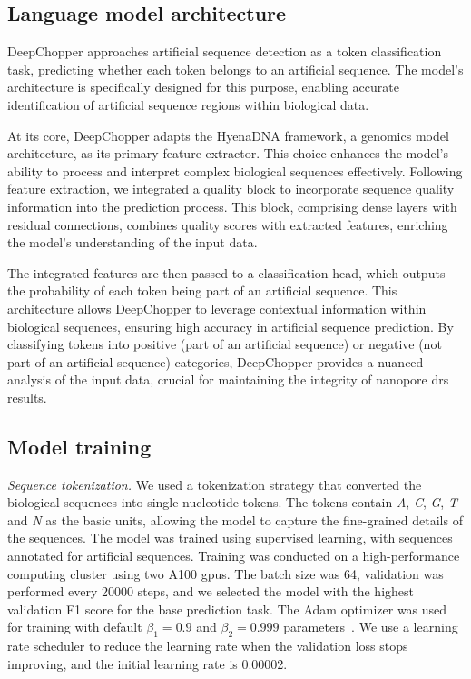 \documentclass[pdflatex, sn-mathphys-num, lineno]{sn-jnl}%
\theoremstyle{thmstyleone}%
\theoremstyle{thmstyletwo}%
\theoremstyle{thmstylethree}%
\begin{document}
\subsection{Language model architecture}\label{ssec:lm}

DeepChopper approaches artificial sequence detection as a token classification task, predicting whether each token belongs to an artificial sequence.
The model's architecture is specifically designed for this purpose, enabling accurate identification of artificial sequence regions within biological data.

At its core, DeepChopper adapts the HyenaDNA framework, a genomics model architecture, as its primary feature extractor.
This choice enhances the model's ability to process and interpret complex biological sequences effectively.
Following feature extraction, we integrated a quality block to incorporate sequence quality information into the prediction process.
This block, comprising dense layers with residual connections, combines quality scores with extracted features, enriching the model's understanding of the input data.

The integrated features are then passed to a classification head, which outputs the probability of each token being part of an artificial sequence.
This architecture allows DeepChopper to leverage contextual information within biological sequences, ensuring high accuracy in artificial sequence prediction.
By classifying tokens into positive (part of an artificial sequence) or negative (not part of an artificial sequence) categories, DeepChopper provides a nuanced analysis of the input data, crucial for maintaining the integrity of nanopore \gls{drs}  results.


\subsection{Model training}\label{ssec:training}

\textit{Sequence tokenization.} We used a tokenization strategy that converted the biological sequences into single-nucleotide tokens.
The tokens contain \emph{A}, \emph{C}, \emph{G}, \emph{T} and \emph{N} as the basic units, allowing the model to capture the fine-grained details of the sequences.
The model was trained using supervised learning, with sequences annotated for artificial sequences.
Training was conducted on a high-performance computing cluster using two A100 \glspl{gpu}.
The batch size was \num{64}, validation was performed every \num{20000} steps, and we selected the model with the highest validation F1 score for the base prediction task.
The Adam optimizer was used for training with default \( \beta_{1} = 0.9 \) and \( \beta_{2} = 0.999 \) parameters~\cite{kingma2014adam}.
We use a learning rate scheduler to reduce the learning rate when the validation loss stops improving, and the initial learning rate is \num{0.00002}.
\end{document}
